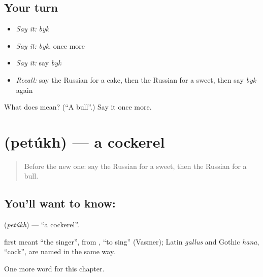 \subsection*{Your turn}
\begin{itemize}
\raggedright
  \item \emph{Say it:} \emph{byk}
  \item \emph{Say it:} \emph{byk}, once more
  \item \emph{Say it:} say \emph{byk}
  \item \emph{Recall:} say the Russian for a cake, then the Russian for a sweet, then say \emph{byk} again
\end{itemize}

\begin{tcolorbox}[breakable,colback=teal!4,colframe=teal!35!black,title={Before you move on}]
What does  mean? (\textquotedblleft{}A bull\textquotedblright{}.) Say it once more.
\end{tcolorbox}
\section[\texorpdfstring{\ru{петух} (petúkh)}{петух (petúkh)}]{ (petúkh) — a cockerel}

\label{lesson:RU-C251-petukh}



\begin{quote}
Before the new one: say the Russian for a sweet, then the Russian for a bull.
\end{quote}

\subsection*{You'll want to know: }
\textbf{} (\emph{petúkh}) — \textquotedblleft{}a cockerel\textquotedblright{}.

\begin{cousinweb}
\textbf{} first meant \textquotedblleft{}the singer\textquotedblright{}, from \emph{}, \textquotedblleft{}to sing\textquotedblright{} (Vasmer); Latin \emph{gallus} and Gothic \emph{hana}, \textquotedblleft{}cock\textquotedblright{}, are named in the same way.
\end{cousinweb}

\begin{grammarlens}[title={What you've built}]
One more word for this chapter.
\end{grammarlens}

